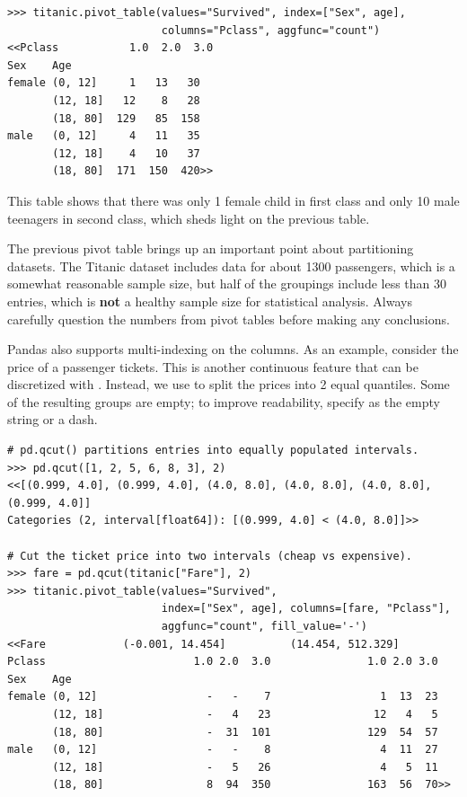 \begin{lstlisting}
>>> titanic.pivot_table(values="Survived", index=["Sex", age],
                        columns="Pclass", aggfunc="count")
<<Pclass           1.0  2.0  3.0
Sex    Age
female (0, 12]     1   13   30
       (12, 18]   12    8   28
       (18, 80]  129   85  158
male   (0, 12]     4   11   35
       (12, 18]    4   10   37
       (18, 80]  171  150  420>>
\end{lstlisting}

This table shows that there was only 1 female child in first class and only 10 male teenagers in second class, which sheds light on the previous table.

\begin{warn}
The previous pivot table brings up an important point about partitioning datasets.
The Titanic dataset includes data for about 1300 passengers, which is a somewhat reasonable sample size, but half of the groupings include less than 30 entries, which is \textbf{not} a healthy sample size for statistical analysis.
Always carefully question the numbers from pivot tables before making any conclusions.
\end{warn}

Pandas also supports multi-indexing on the columns.
As an example, consider the price of a passenger tickets.
This is another continuous feature that can be discretized with .
Instead, we use  to split the prices into 2 equal quantiles.
Some of the resulting groups are empty; to improve readability, specify  as the empty string or a dash.

\begin{lstlisting}
# pd.qcut() partitions entries into equally populated intervals.
>>> pd.qcut([1, 2, 5, 6, 8, 3], 2)
<<[(0.999, 4.0], (0.999, 4.0], (4.0, 8.0], (4.0, 8.0], (4.0, 8.0], (0.999, 4.0]]
Categories (2, interval[float64]): [(0.999, 4.0] < (4.0, 8.0]]>>

# Cut the ticket price into two intervals (cheap vs expensive).
>>> fare = pd.qcut(titanic["Fare"], 2)
>>> titanic.pivot_table(values="Survived",
                        index=["Sex", age], columns=[fare, "Pclass"],
                        aggfunc="count", fill_value='-')
<<Fare            (-0.001, 14.454]          (14.454, 512.329]
Pclass                       1.0 2.0  3.0               1.0 2.0 3.0
Sex    Age
female (0, 12]                 -   -    7                 1  13  23
       (12, 18]                -   4   23                12   4   5
       (18, 80]                -  31  101               129  54  57
male   (0, 12]                 -   -    8                 4  11  27
       (12, 18]                -   5   26                 4   5  11
       (18, 80]                8  94  350               163  56  70>>
\end{lstlisting}

